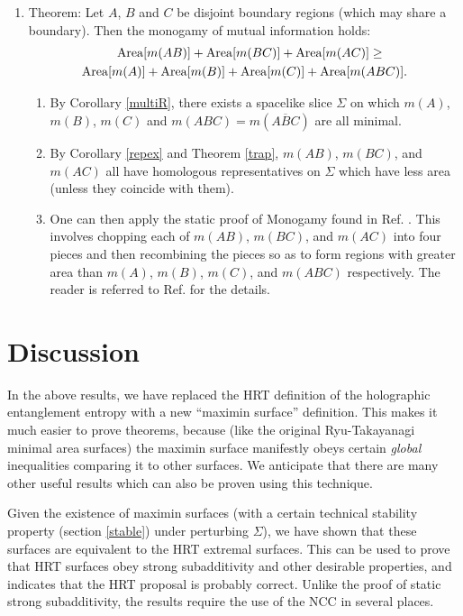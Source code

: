 \documentclass[12pt]{article}
\begin{document}
\begin{enumerate}[resume]
\item \label{mono} Theorem: Let $A$, $B$ and $C$ be disjoint boundary regions (which may share a boundary).  Then the monogamy of mutual information holds:
\begin{align}
\mathrm{Area}[m(AB)] + \mathrm{Area}[m(BC)] + \mathrm{Area}[m(AC)] \ge \phantom{Mn} \notag \\ 
\mathrm{Area}[m(A)] + \mathrm{Area}[m(B)] + \mathrm{Area}[m(C)]  + \mathrm{Area}[m(ABC)].
\end{align}
	\begin{enumerate}
	\item By Corollary \ref{multiR}, there exists a spacelike slice $\Sigma$ on which $m(A)$, $m(B)$, $m(C)$ and 
$m(ABC) = m(\overline{ABC})$ are all minimal.
	\item By Corollary \ref{repex} and Theorem \ref{trap}, $m(AB)$, $m(BC)$, and $m(AC)$ all have homologous representatives on $\Sigma$ which have less area (unless they coincide with them).
	\item One can then apply the static proof of Monogamy found in Ref. \cite{HHM11}.  This involves chopping each of $m(AB)$, $m(BC)$, and $m(AC)$ into four pieces and then recombining the pieces so as to form regions with greater area than $m(A)$, $m(B)$, $m(C)$, and $m(ABC)$ respectively.  The reader is referred to Ref. \cite{HHM11} for the details.
	\end{enumerate}
\end{enumerate}

\section{Discussion}

In the above results, we have replaced the HRT definition of the holographic entanglement entropy with a new ``maximin surface'' definition.  This makes it much easier to prove theorems, because (like the original Ryu-Takayanagi minimal area surfaces) the maximin surface manifestly obeys certain \emph{global} inequalities comparing it to other surfaces.  We anticipate that there are many other useful results which can also be proven using this technique.

Given the existence of maximin surfaces (with a certain technical stability property (section \ref{stable}) under perturbing $\Sigma$), we have shown that these surfaces are equivalent to the HRT extremal surfaces.  This can be used to prove that HRT surfaces obey strong subadditivity and other desirable properties, and indicates that the HRT proposal is probably correct.  Unlike the proof of static strong subadditivity, the results require the use of the NCC in several places.
\end{document}
